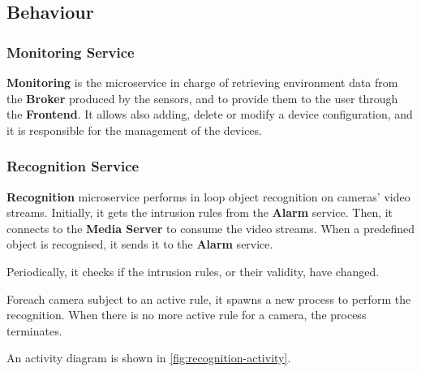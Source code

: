 \documentclass{scrartcl}
\begin{document}
    \subsection{Behaviour}

    \subsubsection{Monitoring Service}

    \textbf{Monitoring} is the microservice in charge of retrieving environment data from the \textbf{Broker} produced by the sensors,
    and to provide them to the user through the \textbf{Frontend}.
    It allows also adding, delete or modify a device configuration, and it is responsible for the management of the devices.

    \subsubsection{Recognition Service}

    \textbf{Recognition} microservice performs in loop object recognition on cameras' video streams.
    Initially, it gets the intrusion rules from the \textbf{Alarm} service.
    Then, it connects to the \textbf{Media Server} to consume the video streams.
    When a predefined object is recognised, it sends it to the \textbf{Alarm} service.

    Periodically, it checks if the intrusion rules, or their validity, have changed.

    Foreach camera subject to an active rule, it spawns a new process to perform the recognition.
    When there is no more active rule for a camera, the process terminates.

    An activity diagram is shown in \cref{fig:recognition-activity}.
\end{document}
